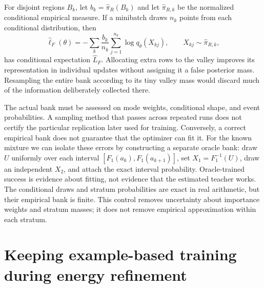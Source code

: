 For disjoint regions $B_k$, let $b_k=\widehat\pi_R(B_k)$ and let
$\widehat\pi_{R,k}$ be the normalized conditional empirical measure. If a
minibatch draws $n_k$ points from each conditional distribution, then
\begin{equation}
 \widehat\ell_F(\theta)
 =-\sum_k\frac{b_k}{n_k}\sum_{j=1}^{n_k}\log q_\theta(X_{kj}),
 \qquad X_{kj}\sim\widehat\pi_{R,k},
\end{equation}
has conditional expectation $\widehat L_F$. Allocating extra rows to the
valley improves its representation in individual updates without assigning
it a false posterior mass. Resampling the entire bank according to its tiny
valley mass would discard much of the information deliberately collected there.

The actual bank must be assessed on mode weights, conditional shape, and event
probabilities. A sampling method that passes across repeated runs does not
certify the particular replication later used for training. Conversely, a
correct empirical bank does not guarantee that the optimizer can fit it.
For the known mixture we can isolate these errors by constructing a separate
oracle bank: draw $U$ uniformly over each interval
$[F_1(a_k),F_1(a_{k+1})]$, set $X_1=F_1^{-1}(U)$, draw an independent
$X_2$, and attach the exact interval probability. Oracle-trained success is
evidence about fitting, not evidence that the estimated teacher works.
The conditional draws and stratum probabilities are exact in real arithmetic,
but their empirical bank is finite. This control removes uncertainty about
importance weights and stratum masses; it does not remove empirical
approximation within each stratum.

\section[Combined forward and reverse training]{Keeping example-based training during energy refinement}

